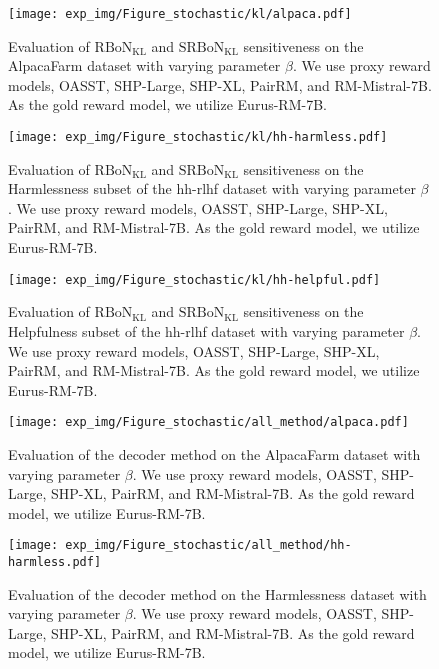 \begin{figure}[htbp]
    \centering
    \texttt{[image: exp\_img/Figure\_stochastic/kl/alpaca.pdf]}
    \caption{
   Evaluation of $\mathrm{RBoN}_{\mathrm{KL}}$ and $\mathrm{SRBoN}_{\mathrm{KL}}$ sensitiveness on the AlpacaFarm dataset with varying parameter $\beta$. We use proxy reward models, OASST, SHP-Large, SHP-XL,  PairRM, and RM-Mistral-7B. As the gold reward model, we utilize Eurus-RM-7B.
    }
    \label{fig:alpaca-kl}
\end{figure}
\begin{figure}[htbp]
    \centering
    \texttt{[image: exp\_img/Figure\_stochastic/kl/hh-harmless.pdf]}
    \caption{
    Evaluation of $\mathrm{RBoN}_{\mathrm{KL}}$ and $\mathrm{SRBoN}_{\mathrm{KL}}$ sensitiveness on the Harmlessness subset of the hh-rlhf dataset with varying parameter $\beta$. We use proxy reward models, OASST, SHP-Large, SHP-XL,  PairRM, and RM-Mistral-7B. As the gold reward model, we utilize Eurus-RM-7B.
    }
    \label{fig:harmless-kl}
\end{figure}

\begin{figure}[htbp]
    \centering
    \texttt{[image: exp\_img/Figure\_stochastic/kl/hh-helpful.pdf]}
    \caption{
    Evaluation of $\mathrm{RBoN}_{\mathrm{KL}}$ and $\mathrm{SRBoN}_{\mathrm{KL}}$ sensitiveness on the Helpfulness subset of the hh-rlhf dataset with varying parameter $\beta$. We use proxy reward models, OASST, SHP-Large, SHP-XL,  PairRM, and RM-Mistral-7B. As the gold reward model, we utilize Eurus-RM-7B.
    }
    \label{fig:helpful-kl}
\end{figure}
\begin{figure}[htbp]
    \centering
    \texttt{[image: exp\_img/Figure\_stochastic/all\_method/alpaca.pdf]}
    \caption{
    Evaluation of the decoder method on the AlpacaFarm dataset with varying parameter $\beta$. We use proxy reward models, OASST, SHP-Large, SHP-XL,  PairRM, and RM-Mistral-7B. As the gold reward model, we utilize Eurus-RM-7B.
    }
    \label{fig:score-a}
\end{figure}

\begin{figure}[htbp]
    \centering
    \texttt{[image: exp\_img/Figure\_stochastic/all\_method/hh-harmless.pdf]}
    \caption{
    Evaluation of the decoder method on the Harmlessness dataset with varying parameter $\beta$. We use proxy reward models, OASST, SHP-Large, SHP-XL,  PairRM, and RM-Mistral-7B. As the gold reward model, we utilize Eurus-RM-7B.
    }
    \label{fig:score-ha}
\end{figure}

